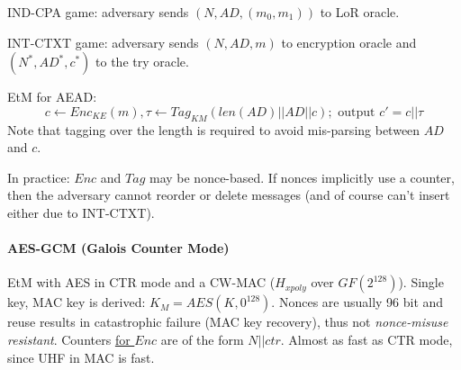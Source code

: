 IND-CPA game:
adversary sends $(N, AD, (m_0, m_1))$ to LoR oracle.

INT-CTXT game:
adversary sends $(N, AD, m)$ to encryption oracle and $(N^*, AD^*, c^*)$ to the try oracle.

EtM for AEAD:
$$
c \leftarrow Enc_{KE}(m), \tau \leftarrow Tag_{KM}(len(AD)||AD||c) ; \text{ output } c'=c||\tau
$$
Note that tagging over the length is required to avoid mis-parsing between $AD$ and $c$.

In practice:
$Enc$ and $Tag$ may be nonce-based.
If nonces implicitly use a counter, then the adversary cannot reorder or delete messages (and of course can't insert either due to INT-CTXT).

\paragraph{AES-GCM (Galois Counter Mode)}
EtM with AES in CTR mode and a CW-MAC ($H_{xpoly}$ over $GF(2^{128})$).
Single key, MAC key is derived: $K_M = AES(K, 0^{128})$.
Nonces are usually 96 bit and reuse results in catastrophic failure (MAC key recovery), thus not \emph{nonce-misuse resistant}.
Counters \underline{for $Enc$} are of the form $N||ctr$.
Almost as fast as CTR mode, since UHF in MAC is fast.

